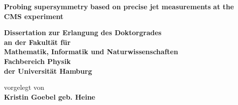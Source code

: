 \documentclass[
twoside,
headsepline,     %
headings=normal,
openright,
numbers=noenddot, %
a4paper
]{scrreprt} %
\author{Kristin Goebel}
\begin{document}
\begin{titlepage}
  \begin{center}
    \thispagestyle{empty}
    \vspace*{1cm}
    \begin{doublespace} 
       \textbf{\Huge Probing supersymmetry}
       \vskip 0.4cm
       \textbf{\Huge based on precise jet measurements}
       \vskip 0.4cm
       \textbf{\Huge at the CMS experiment}
      \vskip2.5cm
      \begin{Large} 
        \textbf{Dissertation zur Erlangung des Doktorgrades\\
          an der Fakult\"{a}t f\"{u}r \\
          Mathematik, Informatik und Naturwissenschaften\\
          Fachbereich Physik\\
          der Universit\"{a}t Hamburg\\}
      \end{Large}
      \vskip2cm
      \begin{large}
        vorgelegt von\\
        {\bf Kristin Goebel geb. Heine}\\
        \vfill
      \end{large}
    \end{doublespace} 
  \end{center}
\end{titlepage}



\end{document}
